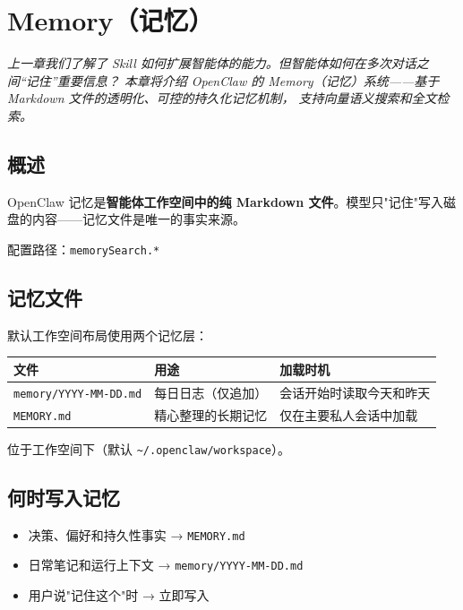 \chapter{Memory（记忆）}

\vspace{0.5em}
\noindent\textit{上一章我们了解了 Skill 如何扩展智能体的能力。但智能体如何在多次对话之间“记住”重要信息？
本章将介绍 OpenClaw 的 Memory（记忆）系统——基于 Markdown 文件的透明化、可控的持久化记忆机制，
支持向量语义搜索和全文检索。}
\vspace{0.5em}

\section{概述}

OpenClaw 记忆是\textbf{智能体工作空间中的纯 Markdown 文件}。模型只"记住"写入磁盘的内容——记忆文件是唯一的事实来源。

配置路径：\texttt{memorySearch.*}

\section{记忆文件}

默认工作空间布局使用两个记忆层：

\begin{center}
\begin{tabular}{lll}
\toprule
\textbf{文件} & \textbf{用途} & \textbf{加载时机} \\
\midrule
\texttt{memory/YYYY-MM-DD.md} & 每日日志（仅追加） & 会话开始时读取今天和昨天 \\
\texttt{MEMORY.md} & 精心整理的长期记忆 & 仅在主要私人会话中加载 \\
\bottomrule
\end{tabular}
\end{center}

位于工作空间下（默认 \texttt{\textasciitilde{}/.openclaw/workspace}）。

\section{何时写入记忆}

\begin{itemize}
  \item 决策、偏好和持久性事实 → \texttt{MEMORY.md}
  \item 日常笔记和运行上下文 → \texttt{memory/YYYY-MM-DD.md}
  \item 用户说"记住这个"时 → 立即写入
\end{itemize}

